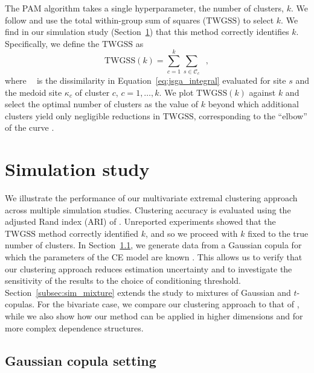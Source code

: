 \documentclass[12pt,compact]{article}
\newcommand{\eJSGa}[1]{\mathop{\mathrm{eJS}_{i, #1}^{\mathrm{G}_{\lambda}}}\nolimits}
\begin{document}
The PAM algorithm takes a single hyperparameter, the number of clusters, $k$.
We follow \citet{Thorndike1953-ie} and use the total within-group sum of squares ($\mathrm{TWGSS}$) to select $k$.
We find in our simulation study (Section~\ref{sec:sim}) that this method correctly identifies $k$.
Specifically, we define the $\mathrm{TWGSS}$ as
\begin{equation}\label{eq:twgss}
  \mathrm{TWGSS}(k) = \sum_{c=1}^{k} \sum_{s \in \mathcal{C}_c} \eJSGa{s, \kappa_c},
\end{equation}
where $\eJSGa{s, \kappa_c}$ is the dissimilarity in Equation~\eqref{eq:jsga_integral} evaluated for site $s$ and the medoid site $\kappa_c$ of cluster $c$, $c = 1, \ldots, k$.
We plot $\mathrm{TWGSS}(k)$ against $k$ and select the optimal number of clusters as the value of $k$ beyond which additional clusters yield only negligible reductions in $\mathrm{TWGSS}$, corresponding to the ``elbow'' of the curve \citep{Hastie2009}.

\section{Simulation study}
\label{sec:sim}

We illustrate the performance of our multivariate extremal clustering approach across multiple simulation studies. 
Clustering accuracy is evaluated using the adjusted Rand index (ARI) of \citet{Hubert1985-ys}. 
Unreported experiments showed that the $\mathrm{TWGSS}$ method correctly identified $k$, and so we proceed with $k$ fixed to the true number of clusters.
In Section~\ref{subsec:sim_gauss}, we generate data from a Gaussian copula for which the parameters of the CE model are known \citep{Keef2013}.
This allows us to verify that our clustering approach reduces estimation uncertainty and to investigate the sensitivity of the results to the choice of conditioning threshold.
Section~\ref{subsec:sim_mixture} extends the study to mixtures of Gaussian and $t$-copulas.
For the bivariate case, we compare our clustering approach to that of \citet{Vignotto2021}, while we also show how our method can be applied in higher dimensions and for more complex dependence structures.

\subsection{Gaussian copula setting}
\label{subsec:sim_gauss}
\end{document}
